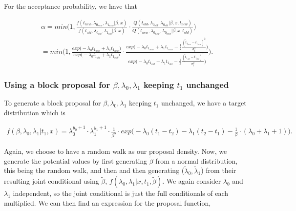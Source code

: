 For the acceptance probability, we have that

\begin{align}
    \alpha = min \Bigg(1,  \frac{
    f(t_{new}, \lambda_{0_{new}}, \lambda_{1_{new}}|\beta, x)}{f(t_{old}, \lambda_{0_{old}}, \lambda_{1_{old}}|\beta, x)}
    \cdot 
    \frac{Q(t_{old}, \lambda_{0_{old}}, \lambda_{0_{old}} | \beta, x, t_{new})}{Q(t_{new}, \lambda_{0_{new}}, \lambda_{0_{new}} | \beta, x, t_{old})} \Bigg) \\
    = min \Bigg(1, \frac{ exp \Big( -\lambda_0t_{1_{new}} +\lambda_1t_{1_{new}}  \Big)}{ exp \Big( -\lambda_0t_{1_{old}} +\lambda_1t_{1_{old}} \Big)} 
    \cdot \frac{ exp \Big(  -\lambda_0 t_{1_{new}} + \lambda_1 t_{1_{new}}   -\frac{1}{2} \frac{(\widetilde{t}_{1_{new}}-t_{1_{new}})^2}{\sigma_t^2} \Big)}{ exp \Big(  -\lambda_0 t_{1_{old}}  + \lambda_1 t_{1_{old}}  -\frac{1}{2} \frac{(\widetilde{t}_{1_{old}}-t_{1_{old}})^2}{\sigma_t^2} \Big)}   \Bigg).
\end{align}




\subsubsection{Using a block proposal for $\beta, \lambda_0, \lambda_1$ keeping $t_1$ unchanged}

To generate a block proposal for $\beta, \lambda_0, \lambda_1$ keeping $t_1$ unchanged, we have a target distribution which is 


\begin{align}
    f(\beta, \lambda_0, \lambda_1| t_1, x) = 
    \lambda_0^{y_0 + 1} \cdot \lambda_1^{y_1 + 1} \cdot \frac{1}{\beta^5} \cdot exp\Bigg(  -\lambda_0(t_1 - t_2) 
    - \lambda_1 (t_2 - t_1 ) 
    - \frac{1}{\beta} \cdot (\lambda_0 + \lambda_1  + 1) \Bigg). 
\end{align}


Again, we choose to have a random walk as our proposal density. Now, we generate the potential values by first generating $\widetilde{\beta}$ from a normal distribution, this being the random walk, and then and then generating ($\widetilde{\lambda}_0, \widetilde{\lambda}_1$) from their resulting joint conditional using $\widetilde{\beta}$, $f(\lambda_0, \lambda_1|x,t_1,\widetilde{\beta})$. 
We again consider $\lambda_0$ and $\lambda_1$ independent, so the joint conditional is just the full conditionals of each multiplied. We can then find an expression for the proposal function,

